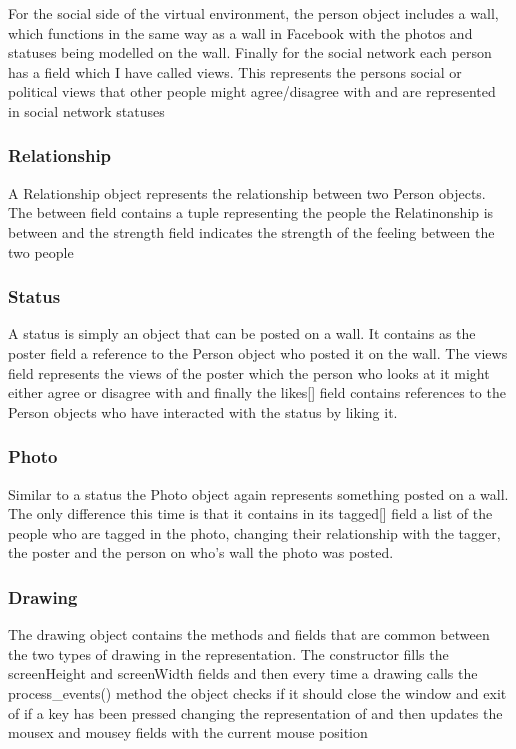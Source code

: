 \documentclass[12pt,a4paper]{article}
\begin{document}
For the social side of the virtual environment, the person object includes a wall, which functions in the same way as a wall in Facebook with the photos and statuses being modelled on the wall. Finally for the social network each person has a field which I have called views. This represents the persons social or political views that other people might agree/disagree with and are represented in social network statuses

\subsubsection{Relationship}
A Relationship object represents the relationship between two Person objects. The between field contains a tuple representing the people the Relatinonship is between and the strength field indicates the strength of the feeling between the two people

\subsubsection{Status}
A status is simply an object that can be posted on a wall. It contains as the poster field a reference to the Person object who posted it on the wall. The views field 
represents the views of the poster which the person who looks at it might either agree or disagree with and finally the likes[] field contains references to the Person objects who have interacted with the status by liking it.

\subsubsection{Photo}
Similar to a status the Photo object again represents something posted on a wall. The only difference this time is that it contains in its tagged[] field a list of the people who are tagged in the photo, changing their relationship with the tagger, the poster and the person on who's wall the photo was posted.

\subsubsection{Drawing}
The drawing object contains the methods and fields that are common between the two types of drawing in the representation. The constructor fills the screenHeight and screenWidth fields and then every time a drawing calls the process\_events() method the object checks if it should close the window and exit of if a key has been pressed changing the representation of and then updates the mousex and mousey fields with the current mouse position
\end{document}
